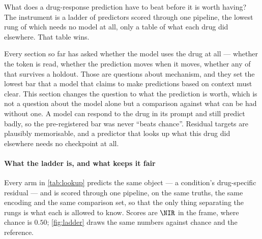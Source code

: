 
\label{sec:methods-baselines}

\begin{question}[7]
What does a drug-response prediction have to beat before it is worth having? The
instrument is a ladder of predictors scored through one pipeline, the lowest rung
of which needs no model at all, only a table of what each drug did elsewhere.
That table wins.
\end{question}

\noindent
Every section so far has asked whether the model uses the drug at all --- whether
the token is read, whether the prediction moves when it moves, whether any of that
survives a holdout. Those are questions about mechanism, and they set the lowest
bar that a model that claims to make predictions based on context must clear. This section changes the question to what the prediction is worth,
which is not a question about the model alone but a comparison against what can be
had without one. A model can respond to the drug in its prompt and still predict
badly, so the pre-registered bar was never ``beats chance''. Residual targets are
plausibly memorisable, and a predictor that looks up what this drug did elsewhere
needs no checkpoint at all. 

\paragraph{What the ladder is, and what keeps it fair} Every arm in
\cref{tab:lookup} predicts the same object --- a condition's drug-specific
residual --- and is scored through one pipeline, on the same truths, the same
encoding and the same comparison set, so that the only thing separating the rungs
is what each is allowed to know. Scores are $\NIR$ in the \Rframe{} frame, where
chance is $0.50$; \cref{fig:ladder} draws the same numbers against chance
and the reference.

